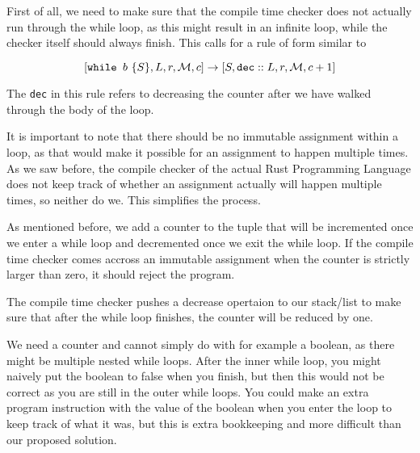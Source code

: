 First of all, we need to make sure that the compile time checker does not actually run through the while loop, as this might result in an infinite loop, while the checker itself should always finish. This calls for a rule of form similar to

$$[ \texttt{while } b~ \{ S \}, L, r, \mathcal{M}, c ] \to [ S, \texttt{dec}::L, r, \mathcal{M}, c+1 ]$$

The \texttt{dec} in this rule refers to decreasing the counter after we have walked through the body of the loop.

It is important to note that there should be no immutable assignment within a loop, as that would make it possible for an assignment to happen multiple times. As we saw before, the compile checker of the actual Rust Programming Language does not keep track of whether an assignment actually will happen multiple times, so  neither do we. This simplifies the process. 

As mentioned before, we add a counter to the tuple that will be incremented once we enter a while loop and decremented once we exit the while loop. If the compile time checker comes accross an immutable assignment when the counter is strictly larger than zero, it should reject the program. 

The compile time checker pushes a decrease opertaion to our stack/list to make sure that after the while loop finishes, the counter will be reduced by one. 

We need a counter and cannot simply do with for example a boolean, as there might be multiple nested while loops. After the inner while loop, you might naively put the boolean to false when you finish, but then this would not be correct as you are still in the outer while loops. You could make an extra program instruction with the value of the boolean when you enter the loop to keep track of what it was, but this is extra bookkeeping and more difficult than our proposed solution.

